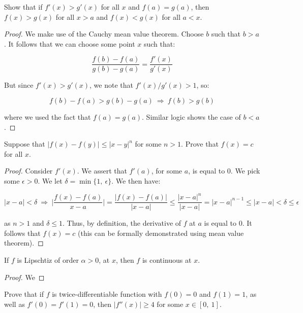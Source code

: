 \documentclass[10pt, oneside]{amsart}
\newenvironment{problem}[2][Problem]{\begin{trivlist}
\item[\hskip \labelsep {\bfseries #1}\hskip \labelsep {\bfseries #2.}]}{\end{trivlist}}
\begin{document}
    \begin{problem}{11.27}
      Show that if $f'(x) > g'(x)$ for all $x$ and $f(a) = g(a)$, then $f(x) > g(x)$ for all $x > a$ and $f(x) < g(x)$ for all $a < x$.
    \end{problem}

    \begin{proof}
      We make use of the Cauchy mean value theorem. Choose $b$ such that $b > a$. It follows that we can choose some point $x$ such that:

      $$\frac{f(b) - f(a)}{g(b) - g(a)} = \frac{f'(x)}{g'(x)}$$

      But since $f'(x) > g'(x)$, we note that $f'(x)/g'(x) > 1$, so:

      $$f(b) - f(a) > g(b) - g(a) \ \Rightarrow \ f(b) > g(b)$$

      where we used the fact that $f(a) = g(a)$. Similar logic shows the case of $b < a$.
    \end{proof}

    \begin{problem}{11.33}
      Suppose that $|f(x) - f(y)| \leq |x - y|^{n}$ for some $n > 1$. Prove that $f(x) = c$ for all $x$.
    \end{problem}

    \begin{proof}
      Consider $f'(x)$. We assert that $f'(a)$, for some $a$, is equal to $0$. We pick some $\epsilon > 0$. We let $\delta = \min \{1, \ \epsilon\}$. We then have:

      $$|x - a| < \delta \ \Rightarrow \ \Big| \frac{f(x) - f(a)}{x - a} \Big| = \frac{|f(x) - f(a)|}{|x - a|} \leq \frac{|x - a|^{n}}{|x - a|} = |x - a|^{n - 1} \leq |x - a| < \delta \leq \epsilon$$

      as $n > 1$ and $\delta \leq 1$. Thus, by definition, the derivative of $f$ at $a$ is equal to $0$. It follows that $f(x) = c$ (this can be formally demonstrated using mean value theorem).
    \end{proof}

    \begin{problem}{11.34a}
      If $f$ is Lipschtiz of order $\alpha > 0$, at $x$, then $f$ is continuous at $x$.
    \end{problem}

    \begin{proof}
      We
    \end{proof}

    \begin{problem}{11.39}
      Prove that if $f$ is twice-differentiable function with $f(0) = 0$ and $f(1) = 1$, as well as $f'(0) = f'(1) = 0$, then $|f''(x)| \geq 4$ for some
      $x \in [0, \ 1]$.
    \end{problem}
\end{document}
